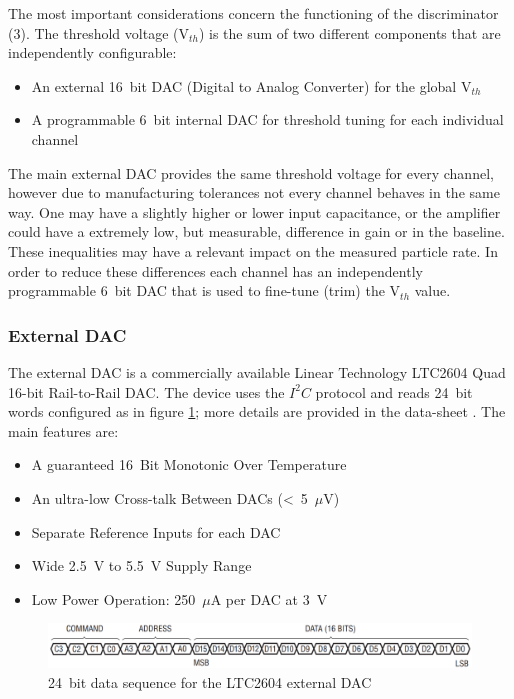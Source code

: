 \noindent The most important considerations concern the functioning of the discriminator (3).
The threshold voltage (V$_{th}$) is the sum of two different components that are independently configurable:
\begin{itemize}
	\item An external 16~bit DAC (Digital to Analog Converter) for the global V$_{th}$ 
	\item A programmable 6~bit internal DAC for threshold tuning for each individual channel
\end{itemize}
\noindent The main external DAC provides the same threshold voltage for every channel, however due to manufacturing tolerances not every channel behaves in the same way. One may have a slightly higher or lower input capacitance, or the amplifier could have a extremely low, but measurable, difference in gain or in the baseline.    
These inequalities may have a relevant impact on the measured particle rate.
In order to reduce these differences each channel has an independently programmable 6~bit DAC that is used to fine-tune (trim) the V$_{th}$ value.    
\subsubsection{External DAC}
The external DAC is a commercially available Linear Technology LTC2604 Quad 16-bit Rail-to-Rail DAC.
The device uses the $I^2C$ protocol and reads 24~bit words configured as in figure \ref{fig:extdactiming2}; more details are provided in the data-sheet \cite{LTC2604}.
The main features are:
\begin{itemize}
	\item A guaranteed 16~Bit Monotonic Over Temperature
	\item An ultra-low Cross-talk Between DACs (<~5~$\mu$V)
	\item Separate Reference Inputs for each DAC
	\item Wide 2.5~V to 5.5~V Supply Range
	\item Low Power Operation: 250~$\mu$A per DAC at 3~V
\end{itemize} 
\begin{figure}[H]
	\centering
	\includegraphics[width=0.99\linewidth]{IMG/ch2/EXTDACTIMING2}
	\caption{24~bit data sequence for the LTC2604 external DAC}
	\label{fig:extdactiming2}
\end{figure}
